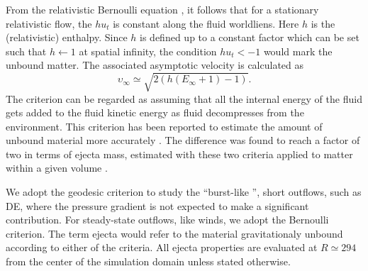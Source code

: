 From the relativistic Bernoulli equation \citep{Rezzolla:2013}, it follows
that for a stationary relativistic flow, the $hu_t$ is constant along the 
fluid worldliens. Here $h$ is the (relativistic) enthalpy. 
%
Since $h$ is defined up to a constant factor which can be set such 
that $h \leftarrow 1$ at spatial infinity, 
the condition $hu_t < -1$ would mark the unbound matter. 
%
The associated asymptotic velocity is calculated as 
%
\begin{equation}
\upsilon_{\infty} \simeq \sqrt{2 (h (E_{\infty}+1)-1)}. 
\end{equation}
%
The criterion can be regarded as assuming that all the internal energy of 
the fluid gets added to the fluid kinetic energy as fluid decompresses from 
the \pmerg{} environment. 
%
%
This criterion has been reported to estimate the amount of unbound material more accurately
\citep{Foucart:2015gaa}. 
The difference was found to reach a 
factor of two in terms of ejecta mass, estimated with these 
two criteria applied to matter within 
a given volume \citep{Kastaun:2014fna}. 



We adopt the geodesic criterion to study the ``burst-like '', short outflows,
such as \ac{DE}, where the pressure gradient is not expected to make a significant contribution.
For steady-state outflows, like \pmerg{} winds, we adopt the Bernoulli criterion.
%
The term ejecta would refer to the material gravitationaly 
unbound according to either of the criteria.
%
All ejecta properties are evaluated at $R \simeq 294$ from the center of the 
simulation domain unless stated otherwise. 



